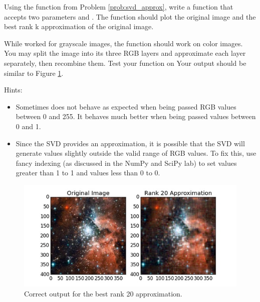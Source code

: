 \begin{problem}
Using the  function from Problem \ref{prob:svd_approx}, write a function  that accepts two parameters  and . The function should plot the original image and the best rank k approximation of the original image. 

While  worked for grayscale images, the  function should work on color images. 
You may split the image into its three RGB layers and approximate each layer separately, then recombine them.
Test your function on 
Your output should be similar to Figure \ref{fig:compressed_image}.

Hints:
\begin{itemize}
\item Sometimes  does not behave as expected when being passed RGB values between 0 and 255. It behaves much better when being passed values between 0 and 1. 
\item Since the SVD provides an approximation, it is possible that the SVD will generate values slightly outside the valid range of RGB values. 
To fix this, use fancy indexing (as discussed in the NumPy and SciPy lab) to set values greater than 1 to 1 and values less than 0 to 0. 
\end{itemize}

\begin{figure}[H]
\includegraphics[width=\textwidth]{compressed.jpg}
\caption{Correct output for the best rank 20 approximation.}
\label{fig:compressed_image}
\end{figure}
\end{problem}
